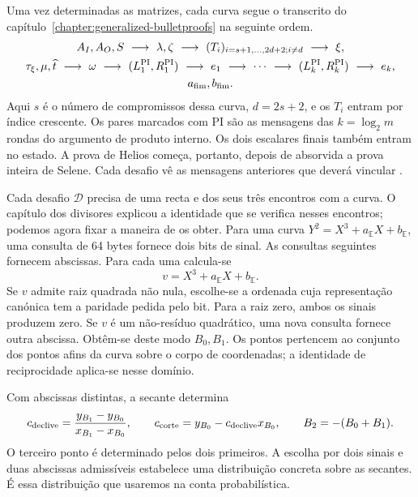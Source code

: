 Uma vez determinadas as matrizes, cada curva segue o transcrito do
capítulo~\ref{chapter:generalized-bulletproofs} na seguinte ordem.
\begin{equation}
 \begin{gathered}
 A_I,A_O,S\ \longrightarrow\ \lambda,\zeta
 \ \longrightarrow\ (T_i)_{i=s+1,\ldots,2d+2; i\ne d}
 \ \longrightarrow\ \xi,\\
 \tau_\xi,\mu,\widehat t\ \longrightarrow\ \omega
 \ \longrightarrow\ (L_1^{\rm PI},R_1^{\rm PI})
 \ \longrightarrow\ e_1\ \longrightarrow\ \cdots
 \ \longrightarrow\ (L_k^{\rm PI},R_k^{\rm PI})
 \ \longrightarrow\ e_k,\\
 a_{\rm fim},b_{\rm fim}.
 \end{gathered}
 \label{eq:fcmp-complete-gbp-transcript}
\end{equation}
Aqui \(s\) é o número de compromissos dessa curva,
\(d=2s+2\), e os \(T_i\) entram por índice crescente.
Os pares marcados com PI são as mensagens das \(k=\log_2m\)
rondas do argumento de produto interno. Os dois escalares
finais também entram no estado. A prova de Helios começa,
portanto, depois de absorvida a prova inteira de Selene.
Cada desafio vê as mensagens anteriores que deverá vincular
\cite{monero-oxide-fcmp-source,generalized-bulletproofs-fixed}.


Cada desafio \(\mathcal D\) precisa de uma recta e dos
seus três encontros com a curva. O capítulo dos divisores
explicou a identidade que se verifica nesses encontros;
podemos agora fixar a maneira de os obter. Para uma curva
\(Y^2=X^3+a_{\mathbb E}X+b_{\mathbb E}\), uma consulta
de 64 bytes fornece dois bits de sinal. As consultas seguintes
fornecem abscissas. Para cada uma calcula-se
\[
 v=X^3+a_{\mathbb E}X+b_{\mathbb E}.
\]
Se \(v\) admite raiz quadrada não nula, escolhe-se a ordenada
cuja representação canónica tem a paridade pedida pelo bit.
Para a raiz zero, ambos os sinais produzem zero.
Se \(v\) é um não-resíduo quadrático, uma nova consulta
fornece outra abscissa. Obtêm-se deste modo \(B_0,B_1\).
Os pontos pertencem ao conjunto dos pontos afins da curva sobre o corpo
de coordenadas; a identidade de reciprocidade aplica-se
nesse domínio.

Com abscissas distintas, a secante determina
\[
 c_{\rm declive}
   =\frac{y_{B_1}-y_{B_0}}{x_{B_1}-x_{B_0}},\qquad
 c_{\rm corte}=y_{B_0}-c_{\rm declive}x_{B_0},\qquad
 B_2=-(B_0+B_1).
\]
O terceiro ponto é determinado pelos dois primeiros.
A escolha por dois sinais e duas abscissas admissíveis
estabelece uma distribuição concreta sobre as secantes.
É essa distribuição que usaremos na conta probabilística.

